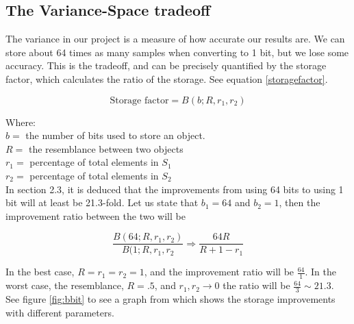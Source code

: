 \documentclass[a4paper,11pt]{article}
\begin{document}
\subsection{The Variance-Space tradeoff}
The variance in our project is a measure of how accurate our results are. We can store about 64 times as many samples when converting to 1 bit, but we lose some accuracy. This is the tradeoff, and can be precisely quantified by the storage factor, which calculates the ratio of the  storage. See equation \ref{storagefactor}.

\begin{equation}
    \text {Storage factor} = B(b;R,r_1,r_2)
    \label{eq:storagefactor}
\end{equation}

Where:\\
$b = $ the number of bits used to store an object. \\
$R = $ the resemblance between two objects \\
$r_1 = $ percentage of total elements in $S_1$ \\
$r_2 = $ percentage of total elements in $S_2$ \\

In \cite{article:bbit} section 2.3, it is deduced that the improvements from using 64 bits to using 1 bit will at least be 21.3-fold. Let us state that $b_1 = 64$ and $b_2 = 1$, then the improvement ratio between the two will be

\begin{equation}
    \frac{B(64;R,r_1,r_2)}{B(1;R,r_1,r_2} \Rightarrow \frac{64 R}{R + 1 - r_1}
    \label{eq:improvementratio}
\end{equation}

In the best case, $R = r_1 = r_2 = 1$, and the improvement ratio will be $\frac{64}{1}$. In the worst case, the resemblance, $R=.5$, and $r_1, r_2 \rightarrow 0$ the ratio will be $\frac{64}{3} \sim 21.3$. See figure \ref{fig:bbit} to see a graph from \cite{book:bbit} which shows the storage improvements with different parameters. \\
\end{document}
